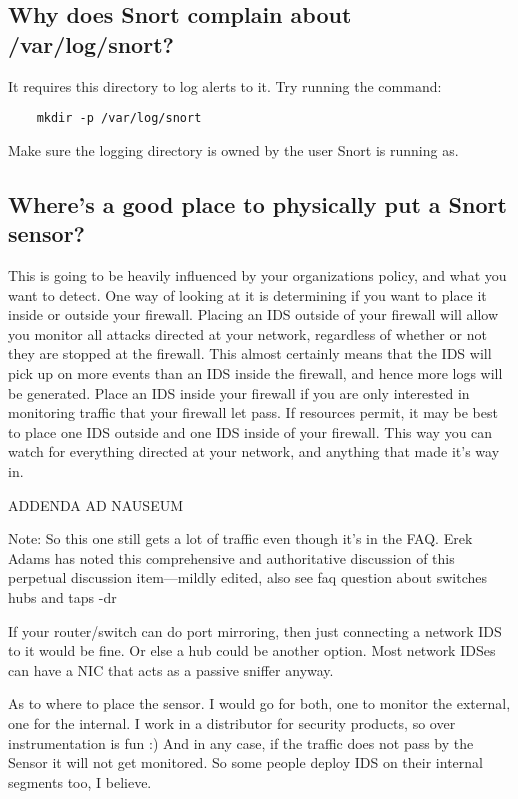 \documentclass{article}
\begin{document}
\subsection{Why does Snort complain about /var/log/snort?}

It requires this directory to log alerts to it. Try running the command:
\begin{verbatim}
    mkdir -p /var/log/snort
\end{verbatim}
Make sure the logging directory is owned by the user Snort is running as.

\subsection{Where's a good place to physically put a Snort sensor?}

This is going to be heavily influenced by your organizations policy, and
what you want to detect.  One way of looking at it is determining if you
want to place it inside or outside your firewall.  Placing an IDS outside
of your firewall will allow you monitor all attacks directed at your
network, regardless of whether or not they are stopped at the firewall.
This almost certainly means that the IDS will pick up on more events
than an IDS inside the firewall, and hence more logs will be generated.
Place an IDS inside your firewall if you are only interested in monitoring
traffic that your firewall let pass.  If resources permit, it may be best
to place one IDS outside and one IDS inside of your firewall.  This way
you can watch for everything directed at your network, and anything that
made it's way in.

ADDENDA AD NAUSEUM

Note: So this one still gets a lot of traffic even though it's in the FAQ. Erek
Adams has noted this comprehensive and authoritative discussion of this
perpetual discussion item---mildly edited, also see faq question about switches
hubs and taps -dr

If your router/switch can do port mirroring, then just connecting a network IDS
to it would be fine. Or else a hub could be another option. Most network IDSes
can have a NIC that acts as a passive sniffer anyway.

As to where to place the sensor. I would go for both, one to monitor the
external, one for the internal. I work in a distributor for security products,
so over instrumentation is fun :) And in any case, if the traffic does not pass
by the Sensor it will not get monitored. So some people deploy IDS on their
internal segments too, I believe.
\end{document}
